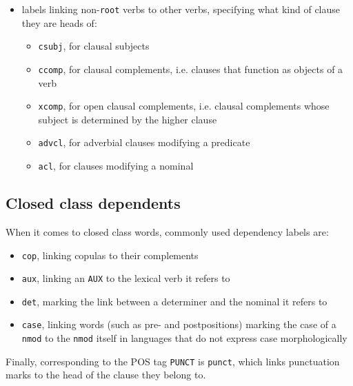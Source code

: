 \begin{itemize}
    \item labels linking non-\texttt{root} verbs to other verbs, specifying what kind of clause they are heads of:
    \begin{itemize}
        \item \texttt{csubj}, for clausal subjects
        \item \texttt{ccomp}, for clausal complements, i.e. clauses that function as objects of a verb
        \item \texttt{xcomp}, for open clausal complements, i.e. clausal complements whose subject is determined by the higher clause
        \item \texttt{advcl}, for adverbial clauses modifying a predicate
        \item \texttt{acl}, for clauses modifying a nominal
    \end{itemize}
\end{itemize}

\subsection{Closed class dependents}
When it comes to closed class words, commonly used dependency labels are:

\begin{itemize}
    \item \texttt{cop}, linking copulas to their complements
    \item \texttt{aux}, linking an \texttt{AUX} to the lexical verb it refers to
    \item \texttt{det}, marking the link between a determiner and the nominal it refers to
    \item \texttt{case}, linking words (such as pre- and postpositions) marking the case of a \texttt{nmod} to the \texttt{nmod} itself in languages that do not express case morphologically
\end{itemize} \smallskip


Finally, corresponding to the POS tag \texttt{PUNCT} is \texttt{punct}, which links punctuation marks to the head of the clause they belong to. \smallskip


